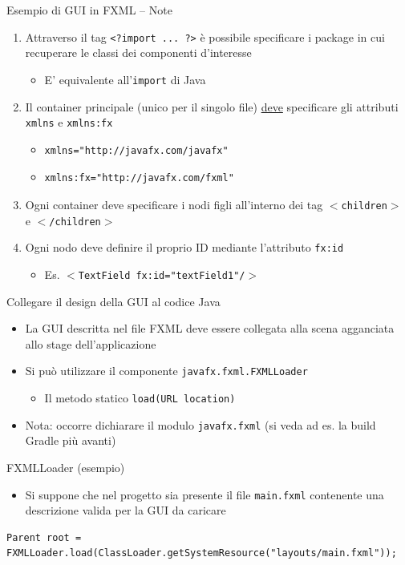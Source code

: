 \documentclass[presentation]{beamer}
\begin{document}
\begin{frame}[fragile]{Esempio di GUI in FXML -- Note}
\begin{enumerate}\itemsep15pt
\item Attraverso il tag \texttt{<?import ... ?>} è possibile specificare i package in cui recuperare le classi dei componenti d'interesse
\begin{itemize}
\item E' equivalente all'\texttt{import} di Java
\end{itemize}
\item Il container principale (unico per il singolo file) \underline{deve} specificare gli attributi \texttt{xmlns} e \texttt{xmlns:fx}
\begin{itemize}
\item \begin{verbatim}xmlns="http://javafx.com/javafx"\end{verbatim}
\item \begin{verbatim}xmlns:fx="http://javafx.com/fxml"\end{verbatim}
\end{itemize}
\item Ogni container deve specificare i nodi figli all'interno dei tag \texttt{$<$children$>$} e \texttt{$<$/children$>$}
\item Ogni nodo deve definire il proprio ID mediante l'attributo \texttt{fx:id}
\begin{itemize}
\item Es. \texttt{$<$TextField fx:id="textField1"/$>$}
\end{itemize}
\end{enumerate}
\end{frame}

\begin{frame}[fragile]{Collegare il design della GUI al codice Java}
\begin{itemize}\itemsep10pt
\item La GUI descritta nel file FXML deve essere collegata alla scena agganciata allo stage dell'applicazione
\item Si può utilizzare il componente \texttt{javafx.fxml.FXMLLoader}
\begin{itemize}
\item Il metodo statico \texttt{load(URL location)}
\end{itemize}
\item Nota: occorre dichiarare il modulo \texttt{javafx.fxml} (si veda ad es. la build Gradle più avanti)
\end{itemize}
\begin{block}{FXMLLoader (esempio)}
\begin{itemize}
\item Si suppone che nel progetto sia presente il file \texttt{main.fxml} contenente una descrizione valida per la GUI da caricare
\end{itemize}
\begin{lstlisting}
Parent root = FXMLLoader.load(ClassLoader.getSystemResource("layouts/main.fxml"));
\end{lstlisting}
\end{block}
\end{frame}
\end{document}
